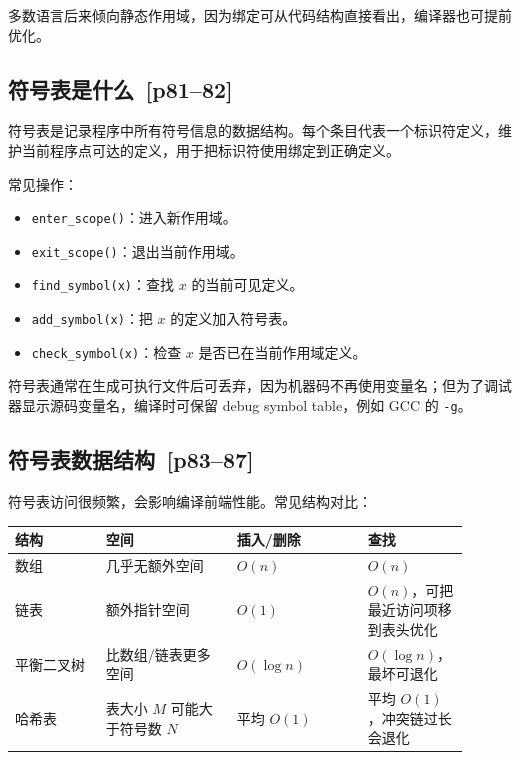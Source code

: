 \documentclass[UTF8,fontset=none,11pt]{ctexart}
\newenvironment{defbox}[1][]{%
  \par\medskip\noindent{\color{defrule}\rule{\linewidth}{1.1pt}}\par\nopagebreak
  \noindent{\bfseries\color{defrule}#1}\par\nopagebreak\smallskip}%
  {\par\nopagebreak\smallskip\noindent{\color{defrule}\rule{\linewidth}{0.4pt}}\par\medskip}
\newcommand{\pg}[1]{\texorpdfstring{{\small\color{graytext}\,[p#1]}}{ [p#1]}}
\begin{document}
多数语言后来倾向静态作用域，因为绑定可从代码结构直接看出，编译器也可提前优化。

\subsection{符号表是什么 \pg{81--82}}

\begin{defbox}[Symbol table]
符号表是记录程序中所有符号信息的数据结构。每个条目代表一个标识符定义，维护当前程序点可达的定义，用于把标识符使用绑定到正确定义。
\end{defbox}

常见操作：

\begin{itemize}
  \item \texttt{enter\_scope()}：进入新作用域。
  \item \texttt{exit\_scope()}：退出当前作用域。
  \item \texttt{find\_symbol(x)}：查找 \(x\) 的当前可见定义。
  \item \texttt{add\_symbol(x)}：把 \(x\) 的定义加入符号表。
  \item \texttt{check\_symbol(x)}：检查 \(x\) 是否已在当前作用域定义。
\end{itemize}

符号表通常在生成可执行文件后可丢弃，因为机器码不再使用变量名；但为了调试器显示源码变量名，编译时可保留 debug symbol table，例如 GCC 的 \texttt{-g}。

\subsection{符号表数据结构 \pg{83--87}}

符号表访问很频繁，会影响编译前端性能。常见结构对比：

\begin{longtable}{L{0.18\linewidth}L{0.26\linewidth}L{0.26\linewidth}L{0.20\linewidth}}
\toprule
结构 & 空间 & 插入/删除 & 查找 \\
\midrule
数组 & 几乎无额外空间 & \(O(n)\) & \(O(n)\) \\
链表 & 额外指针空间 & \(O(1)\) & \(O(n)\)，可把最近访问项移到表头优化 \\
平衡二叉树 & 比数组/链表更多空间 & \(O(\log n)\) & \(O(\log n)\)，最坏可退化 \\
哈希表 & 表大小 \(M\) 可能大于符号数 \(N\) & 平均 \(O(1)\) & 平均 \(O(1)\)，冲突链过长会退化 \\
\bottomrule
\end{longtable}
\end{document}
